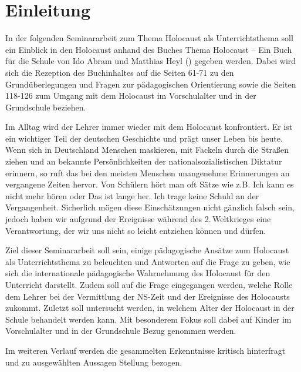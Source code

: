 \section{Einleitung} 
In der folgenden Seminararbeit zum Thema \glqq Holocaust als Unterrichtsthema\grqq{} soll ein Einblick in den Holocaust anhand des Buches \glqq Thema Holocaust – Ein Buch für die Schule\grqq{} von Ido Abram und Matthias Heyl (\cite{IA96}) gegeben werden.
Dabei wird sich die Rezeption des Buchinhaltes auf die Seiten 61-71 zu den Grundüberlegungen und Fragen zur pädagogischen Orientierung sowie die Seiten 118-126 zum Umgang mit dem Holocaust im Vorschulalter und in der Grundschule beziehen.

Im Alltag wird der Lehrer immer wieder mit dem Holocaust konfrontiert.
Er ist ein wichtiger Teil der deutschen Geschichte und prägt unser Leben bis heute.
Wenn sich in Deutschland Menschen maskieren, mit Fackeln durch die Straßen ziehen und an bekannte Persönlichkeiten der nationalsozialistischen Diktatur \glqq erinnern\grqq{}, so ruft das bei den meisten Menschen unangenehme Erinnerungen an vergangene Zeiten hervor.
Von Schülern hört man oft Sätze wie z.B. \glqq Ich kann es nicht mehr hören\grqq{} oder \glqq Das ist lange her.
Ich trage keine Schuld an der Vergangenheit.\grqq{}
Sicherlich mögen diese Einschätzungen nicht gänzlich falsch sein, jedoch haben wir aufgrund der Ereignisse während des 2.\,Weltkrieges eine Verantwortung, der wir uns nicht so leicht entziehen können und dürfen.

Ziel dieser Seminararbeit soll sein, einige pädagogische Ansätze zum Holocaust als Unterrichtsthema zu beleuchten und Antworten auf die Frage zu geben, wie sich die internationale pädagogische Wahrnehmung des Holocaust für den Unterricht darstellt.
Zudem soll auf die Frage eingegangen werden, welche Rolle dem Lehrer bei der Vermittlung der NS-Zeit und der Ereignisse des Holocausts zukommt.
Zuletzt soll untersucht werden, in welchem Alter der Holocaust in der Schule behandelt werden kann.
Mit besonderem Fokus soll dabei auf Kinder im Vorschulalter und in der Grundschule Bezug genommen werden.

Im weiteren Verlauf werden die gesammelten Erkenntnisse kritisch hinterfragt und zu ausgewählten Aussagen Stellung bezogen.

